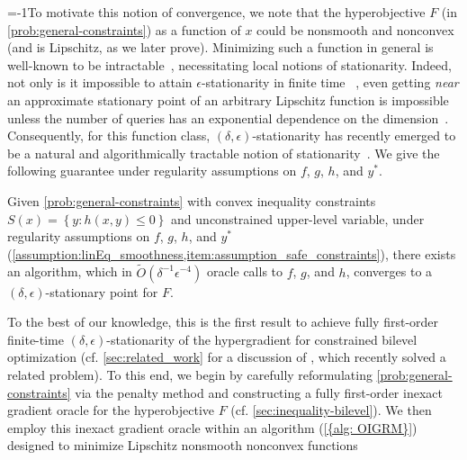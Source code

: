 \begin{description}[style=unboxed,leftmargin=0cm, itemsep=.5em, parsep=.3em, topsep=.5em]
\looseness=-1To motivate this notion of convergence, we note that the hyperobjective $F$ (in \cref{prob:general-constraints}) as a function of $x$ could be nonsmooth and nonconvex (and is Lipschitz, as  we later prove). Minimizing such a function in general is well-known to be intractable~\cite{nemirovskij1983problem}, necessitating local notions of stationarity. Indeed, not only is it impossible to attain $\epsilon$-stationarity in finite time~ \cite{zhang2020complexity}, even getting \textit{near} an
approximate stationary point of an arbitrary Lipschitz function is impossible unless
the number of queries has an exponential dependence on the dimension~\cite{kornowski2022oracle}. Consequently, for this function class, $(\delta, \epsilon)$-stationarity has recently emerged to be a natural and algorithmically tractable notion of stationarity~\cite{zhang2020complexity}. We give the following guarantee under  regularity assumptions on $f$, $g$, $h$, and $y^*$. 
\begin{theorem}
    Given \cref{prob:general-constraints} with convex inequality constraints $S(x)=\left\{y:h(x,y)\leq0\right\}$ and unconstrained upper-level variable, under  regularity assumptions on $f$, $g$, $h$, and $y^*$ (\cref{assumption:linEq_smoothness,item:assumption_safe_constraints}), there exists an algorithm, which in $\widetilde{O}(\delta^{-1}\epsilon^{-4})$ oracle calls to $f$, $g$, and $h$, converges to a $(\delta, \epsilon)$-stationary point for $F$. 
\end{theorem} To the best of our knowledge, this is the first result to achieve fully first-order finite-time $(\delta,\epsilon)$-stationarity of the hypergradient for constrained bilevel optimization (cf. \cref{sec:related_work} for a discussion of \cite{yao2024constrained}, which recently solved a related problem). 
To this end, we begin by carefully reformulating \cref{prob:general-constraints} via the penalty method and constructing a fully first-order inexact gradient oracle for the hyperobjective $F$ (cf. \cref{sec:inequality-bilevel}). We then employ this inexact gradient oracle within {an algorithm (\cref{{alg: OIGRM}}) designed to minimize Lipschitz nonsmooth nonconvex functions}

\end{description}
